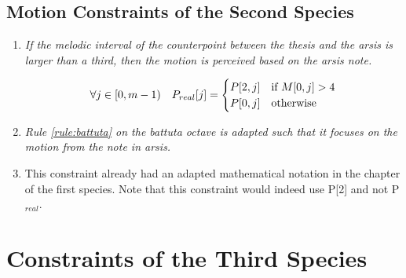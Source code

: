 \subsection*{Motion Constraints of the Second Species}
\begin{enumerate}[wide, label=\bfseries 2.P\arabic*]

\item\label{rule:motion2nd}{\textit{If the melodic interval of the counterpoint between the thesis and the arsis is larger than a third, then the motion is perceived based on the arsis note.}}


\begin{equation}
    \begin{gathered}
        \forall j \in [0, m-1) \quad
        P_{real}[j] = \begin{cases}
            P[2, j] & \text{if } M[0, j] > 4\\
            P[0, j] & \text{otherwise}
        \end{cases}
    \end{gathered}
\end{equation}

\item\label{rule:battuta2}{ \textit{Rule \ref{rule:battuta} on the battuta octave is adapted such that it focuses on the motion from the note in arsis.}}
\item 
This constraint already had an adapted mathematical notation in the chapter of
the first species. Note that this constraint would indeed use P[2] and not P$_{real}$.


\end{enumerate}

\section*{Constraints of the Third Species}
